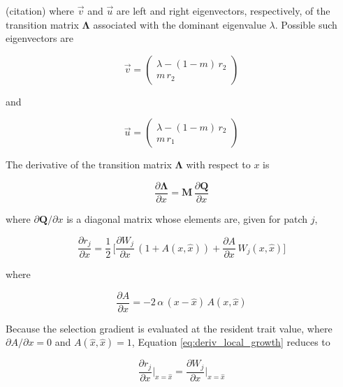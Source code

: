 (citation) where $\overrightarrow{v}$ and $\overrightarrow{u}$ are left and right eigenvectors, respectively, of the transition matrix $\pmb{\Lambda}$ associated with the dominant eigenvalue $\lambda$. Possible such eigenvectors are

\begin{equation}
    \overrightarrow{v} = 
    \begin{pmatrix}
        \lambda - (1-m)\,r_2 \\
        m\,r_2 
    \end{pmatrix}
    \label{eq:left_eigenvector}
\end{equation}

and

\begin{equation}
    \overrightarrow{u} = 
    \begin{pmatrix}
        \lambda - (1-m)\,r_2 \\
        m\,r_1
    \end{pmatrix}
\end{equation}

The derivative of the transition matrix $\pmb\Lambda$ with respect to $x$ is

\begin{equation}
    \frac{\partial \pmb{\Lambda}}{\partial x} = \pmb{M} \, \frac{\partial \pmb{Q}}{\partial x}
\end{equation}

where $\partial \pmb{Q} / \partial x$ is a diagonal matrix whose elements are, given for patch $j$,

\begin{equation}
    \frac{\partial r_j}{\partial x} = \frac{1}{2} \, \bigg[\frac{\partial W_j}{\partial x} \, (1 + A(x, \hat{x})) + \frac{\partial A}{\partial x} \, W_j(x, \hat{x})\bigg]
    \label{eq:deriv_local_growth}
\end{equation}

where

\begin{equation}
    \frac{\partial A}{\partial x} = -2 \, \alpha \, (x - \hat{x}) \, A(x, \hat{x})
\end{equation}

Because the selection gradient is evaluated at the resident trait value, where $\partial A / \partial x = 0$ and $A(\hat{x},\hat{x}) = 1$, Equation \ref{eq:deriv_local_growth} reduces to

\begin{equation}
    \frac{\partial r_j}{\partial x}\bigg|_{x=\hat{x}} = \frac{\partial W_j}{\partial x}\bigg|_{x=\hat{x}} 
\end{equation}

